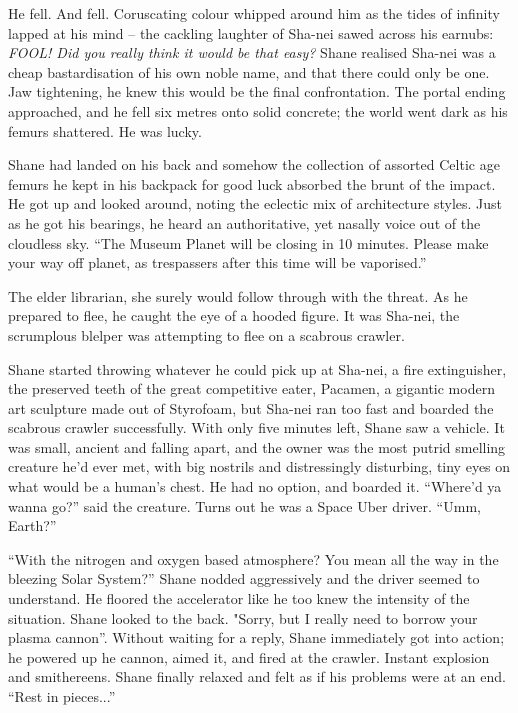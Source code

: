 He fell. And fell. Coruscating colour whipped around him as the tides of infinity lapped at his mind – the cackling laughter of Sha-nei sawed across his earnubs: \emph{FOOL! Did you really think it would be that easy?} Shane realised Sha-nei was a cheap bastardisation of his own noble name, and that there could only be one. Jaw tightening, he knew this would be the final confrontation. The portal ending approached, and he fell six metres onto solid concrete; the world went dark as his femurs shattered. He was lucky.

Shane had landed on his back and somehow the collection of assorted Celtic age femurs he kept in his backpack for good luck absorbed the brunt of the impact. He got up and looked around, noting the eclectic mix of architecture styles. Just as he got his bearings, he heard an authoritative, yet nasally voice out of the cloudless sky. “The Museum Planet will be closing in 10 minutes. Please make your way off planet, as trespassers after this time will be vaporised.”

The elder librarian, she surely would follow through with the threat. As he prepared to flee, he caught the eye of a hooded figure. It was Sha-nei, the scrumplous blelper was attempting to flee on a scabrous crawler.

Shane started throwing whatever he could pick up at Sha-nei, a fire extinguisher, the preserved teeth of the great competitive eater, Pacamen, a gigantic modern art sculpture made out of Styrofoam, but Sha-nei ran too fast and boarded the scabrous crawler successfully. With only five minutes left, Shane saw a vehicle. It was small, ancient and falling apart, and the owner was the most putrid smelling creature he’d ever met, with big nostrils and distressingly disturbing, tiny eyes on what would be a human’s chest. He had no option, and boarded it. ``Where'd ya wanna go?'' said the creature. Turns out he was a Space Uber driver. ``Umm, Earth?''

``With the nitrogen and oxygen based atmosphere? You mean all the way in the bleezing Solar System?'' Shane nodded aggressively and the driver seemed to understand. He floored the accelerator like he too knew the intensity of the situation. Shane looked to the back. "Sorry, but I really need to borrow your plasma cannon”. Without waiting for a reply, Shane immediately got into action; he powered up he cannon, aimed it, and fired at the crawler. Instant explosion and smithereens. Shane finally relaxed and felt as if his problems were at an end. ``Rest in pieces...''

